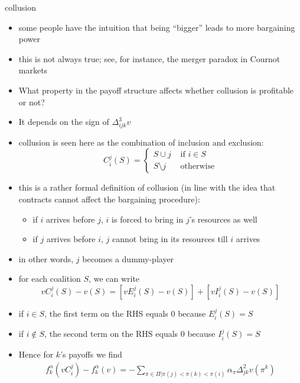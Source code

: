 \documentclass[11pt,english]{beamer}
\begin{document}
\begin{frame}[allowframebreaks]{collusion}
  \begin{itemize}
  \item some people have the intuition that being ``bigger'' leads to
    more bargaining power
  \item this is not always true; see, for instance, the merger paradox
    in Cournot markets
  \item What property in the payoff structure affects whether
    collusion is profitable or not?
  \item It depends on the sign of $\Delta_{ijk}^3v$
  \item collusion is seen here as the combination of inclusion and
    exclusion:
    \begin{equation*}
      C_i^j(S) =
      \begin{cases}
        S \cup j &\text{ if } i \in S \\
        S\setminus j &\text{ otherwise}
      \end{cases}
    \end{equation*}
  \item this is a rather formal definition of collusion (in line with
    the idea that contracts cannot affect the bargaining procedure):
    \begin{itemize}
    \item if $i$ arrives before $j$, $i$ is forced to bring in $j$'s
      resources as well
    \item if $j$ arrives before $i$, $j$ cannot bring in its resources
      till $i$ arrives
    \end{itemize}
  \item in other words, $j$ becomes a dummy-player
  \item for each coalition $S$, we can write
    \begin{equation*}
      vC_i^j(S) -v(S) = [vE_i^j(S)-v(S)] + [vI_i^j(S)-v(S)]
    \end{equation*}
  \item if $i \in S$, the first term on the RHS equals 0 because $E_i^j(S)=S$
  \item if $i \notin S$, the second term on the RHS equals 0 because
    $I_i^j(S)=S$
  \item Hence for $k$'s payoffs we find
      \begin{eqnarray*}
        f_k^\alpha(vC_i^j)-f_k^\alpha(v) = -\sum_{\pi \in
          \Pi| \pi(j)<\pi(k)<\pi(i)} \alpha_\pi \Delta^2_{jk} v(\pi^k) \\

\end{eqnarray*}
\end{itemize}
\end{frame}
\end{document}
